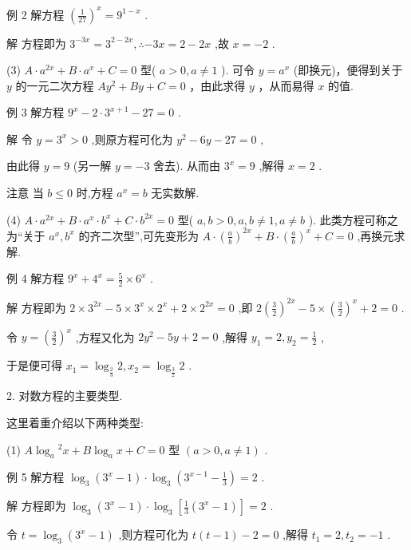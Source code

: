 \documentclass[10pt]{article}
\begin{document}
例 2 解方程 \({\left( \frac{1}{27}\right) }^{x} = {9}^{1 - x}\) .

解 方程即为 \({3}^{-{3x}} = {3}^{2 - {2x}},\therefore  - {3x} = 2 - {2x}\) ,故 \(x =  - 2\) .

(3) \(A \cdot  {a}^{2x} + B \cdot  {a}^{x} + C = 0\) 型( \(a > 0,a \neq  1\) ). 可令 \(y = {a}^{x}\) (即换元)，便得到关于 \(y\) 的一元二次方程 \(A{y}^{2} + {By} + C = 0\) ，由此求得 \(y\) ，从而易得 \(x\) 的值.

例 3 解方程 \({9}^{x} - 2 \cdot  {3}^{x + 1} - {27} = 0\) .

解 令 \(y = {3}^{x} > 0\) ,则原方程可化为 \({y}^{2} - {6y} - {27} = 0\) ,

由此得 \(y = 9\) (另一解 \(y =  - 3\) 舍去). 从而由 \({3}^{x} = 9\) ,解得 \(x = 2\) .

注意 当 \(b \leq  0\) 时,方程 \({a}^{x} = b\) 无实数解.

(4) \(A \cdot  {a}^{2x} + B \cdot  {a}^{x} \cdot  {b}^{x} + C \cdot  {b}^{2x} = 0\) 型( \(a,b > 0,a,b \neq  1,a \neq  b\) ). 此类方程可称之为“关于 \({a}^{x},{b}^{x}\) 的齐二次型”,可先变形为 \(A \cdot  {\left( \frac{a}{b}\right) }^{2x} + B \cdot  {\left( \frac{a}{b}\right) }^{x} + C = 0\) ,再换元求解.

例 4 解方程 \({9}^{x} + {4}^{x} = \frac{5}{2} \times  {6}^{x}\) .

解 方程即为 \(2 \times  {3}^{2x} - 5 \times  {3}^{x} \times  {2}^{x} + 2 \times  {2}^{2x} = 0\) ,即 \(2{\left( \frac{3}{2}\right) }^{2x} - 5 \times  {\left( \frac{3}{2}\right) }^{x} + 2 = 0\) .

令 \(y = {\left( \frac{3}{2}\right) }^{x}\) ,方程又化为 \(2{y}^{2} - {5y} + 2 = 0\) ,解得 \({y}_{1} = 2,{y}_{2} = \frac{1}{2}\) ,

于是便可得 \({x}_{1} = {\log }_{\frac{2}{3}}2,{x}_{2} = {\log }_{\frac{3}{2}}2\) .

2. 对数方程的主要类型.

这里着重介绍以下两种类型:

(1) \(A{\log }_{a}{}^{2}x + B{\log }_{a}x + C = 0\) 型 \(\left( {a > 0,a \neq  1}\right)\) .

例 5 解方程 \({\log }_{3}\left( {{3}^{x} - 1}\right)  \cdot  {\log }_{3}\left( {{3}^{x - 1} - \frac{1}{3}}\right)  = 2\) .

解 方程即为 \({\log }_{3}\left( {{3}^{x} - 1}\right)  \cdot  {\log }_{3}\left\lbrack  {\frac{1}{3}\left( {{3}^{x} - 1}\right) }\right\rbrack   = 2\) .

令 \(t = {\log }_{3}\left( {{3}^{x} - 1}\right)\) ,则方程可化为 \(t\left( {t - 1}\right)  - 2 = 0\) ,解得 \({t}_{1} = 2,{t}_{2} =  - 1\) .
\end{document}
